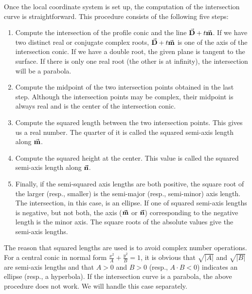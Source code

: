      Once the local coordinate system is set up, the computation of the 
intersection curve is straightforward.  This procedure consists of the
following five steps:
\begin{enumerate}
     \item Compute the intersection of the profile conic and the line
          $\vec{\bf D}+t\vec{\bf m}$.  If we have two distinct real or conjugate
          complex roots, $\vec{\bf D}+t\vec{\bf m}$ is one of the axis of the 
          intersection conic.  If we have a double root, the given plane 
          is tangent to the surface.  If there is only one real root (the other
          is at infinity), the intersection will be a parabola.
     \item Compute the midpoint of the two intersection points obtained in
          the last step.  Although the intersection points may be complex, 
          their midpoint is always real and is the center of the intersection 
          conic.
     \item Compute the squared length between the two intersection points.
          This gives us a real number.  The quarter of it is called the
          squared semi-axis length along $\vec{\bf m}$.
     \item Compute the squared height at the center.  This value is called the
          squared semi-axis length along $\vec{\bf n}$.
     \item Finally, if the semi-squared axis lengths are both positive, the 
          square root of the larger (resp., smaller) is the semi-major 
          (resp., semi-minor) axis length.  The intersection, in this case, 
          is an ellipse.  If one of squared semi-axis lengths is negative, but 
          not both, the axis ($\vec{\bf m}$ or $\vec{\bf n}$) corresponding to the 
          negative length is the minor axis.  The square roots of the absolute
          values give the semi-axis lengths.
\end{enumerate}
The reason that squared lengths are used is to avoid complex number operations.
For a central conic in normal form $\frac{x^2}{A}+\frac{y^2}{B}=1$, it is 
obvious that $\sqrt{|A|}$ and $\sqrt{|B|}$ are semi-axis lengths and that 
$A>0$ and $B>0$ (resp., $A\cdot B<0$) indicates an ellipse 
(resp., a hyperbola).  If the intersection curve is a parabola, the above 
procedure does not work.  We will handle this case separately.


